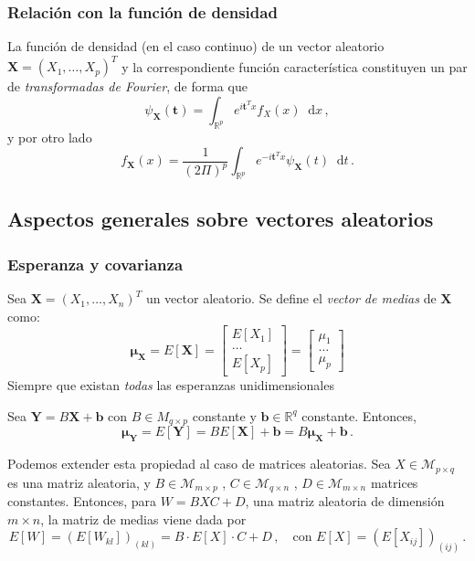 \subsubsection{Relación con la función de densidad}

La función de densidad (en el caso continuo) de un vector aleatorio $\boldsymbol X = (X_1,\dots,X_p)^T$ y la correspondiente función característica constituyen un par de \emph{transformadas de Fourier}, de forma que
\[
\psi_{\boldsymbol X}(\boldsymbol t) = \int_{\mathbb R ^p} e^{i \boldsymbol t^T x} f_X(x) \mathop{}\!\mathrm{d}x\,,
\]
y por otro lado
\[
f_{\boldsymbol X}(x) =  \dfrac{1}{(2\Pi)^p} \int_{\mathbb R^p} e^{- i \boldsymbol t^T x} \psi_{\boldsymbol X}(t) \mathop{}\!\mathrm{d}t\,.
\]


\subsection{Aspectos generales sobre vectores aleatorios}
\subsubsection{Esperanza y covarianza}
\begin{ndef}
  Sea $\boldsymbol X=(X_1,\dots,X_n)^T$ un vector aleatorio. Se define el \textit{vector de medias} de $\boldsymbol X$ como:
  \[
  \boldsymbol \mu_{\boldsymbol X} = E[\boldsymbol X] = \begin{bmatrix}  E[X_1] \\ \dots \\ E[X_p] \end{bmatrix} = \begin{bmatrix} \mu_1 \\ \dots \\ \mu_p \end{bmatrix}
  \]
  Siempre que existan \emph{todas} las esperanzas unidimensionales
  \end{ndef}

\begin{nprop}
  Sea $\boldsymbol Y = B\boldsymbol X + \boldsymbol b$ con $B \in M_{q\times p}$ constante y $\boldsymbol b \in \mathbb R^q$ constante. Entonces,
  \[
    \boldsymbol \mu_{\boldsymbol Y} = E[\boldsymbol Y] = BE[\boldsymbol X] + \boldsymbol b = B\boldsymbol \mu_{\boldsymbol X} + \boldsymbol b\,.
\]
\end{nprop}

Podemos extender esta propiedad al caso de matrices aleatorias. Sea $X\in \mathcal M_{p\times q}$ es una matriz aleatoria, y $B\in \mathcal M_{m\times p}$ , $C \in \mathcal M_{q\times n}$ , $D \in \mathcal M_{m \times n}$ matrices constantes. Entonces, para $W = BXC + D$, una matriz aleatoria de dimensión $m\times n$, la matriz de medias viene dada por
\[
E[W] = \left(E[W_{kl}]\right)_{(kl)} = B \cdot E[X] \cdot C + D\,, \quad \text{con } E[X] = \left(E[X_{ij}]\right)_{(ij)}\,.
\]

